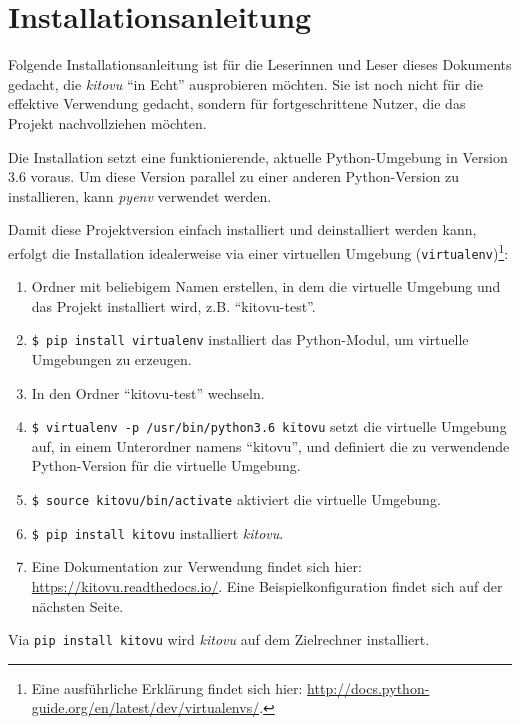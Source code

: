 \documentclass[a4paper]{article}
\let\oldsection\section
\renewcommand\section{\clearpage\oldsection}
\begin{document}
\section{Installationsanleitung}

Folgende Installationsanleitung ist für die Leserinnen und Leser dieses Dokuments gedacht, die \emph{kitovu} ``in Echt'' ausprobieren möchten. Sie ist noch nicht für die effektive Verwendung gedacht, sondern für fortgeschrittene Nutzer, die das Projekt nachvollziehen möchten.

Die Installation setzt eine funktionierende, aktuelle Python-Umgebung in Version 3.6 voraus. Um diese Version parallel zu einer anderen Python-Version zu installieren, kann \emph{pyenv} verwendet werden.

Damit diese Projektversion einfach installiert und deinstalliert werden kann, erfolgt die Installation idealerweise via einer virtuellen Umgebung (\verb|virtualenv|)\footnote{Eine ausführliche Erklärung findet sich hier: \url{http://docs.python-guide.org/en/latest/dev/virtualenvs/}.}:

\begin{enumerate}
	\item Ordner mit beliebigem Namen erstellen, in dem die virtuelle Umgebung und das Projekt installiert wird, z.B. ``kitovu-test''.
	\item \verb|$ pip install virtualenv| \newline
	installiert das Python-Modul, um virtuelle Umgebungen zu erzeugen.
	\item In den Ordner ``kitovu-test'' wechseln.
	\item \verb|$ virtualenv -p /usr/bin/python3.6 kitovu| \newline
	setzt die virtuelle Umgebung auf, in einem Unterordner namens ``kitovu'', und definiert die zu verwendende Python-Version für die virtuelle Umgebung.
	\item \verb|$ source kitovu/bin/activate| \newline
	aktiviert die virtuelle Umgebung.
	\item \verb|$ pip install kitovu| \newline 
	installiert \emph{kitovu}.
	\item Eine Dokumentation zur Verwendung findet sich hier: \url{https://kitovu.readthedocs.io/}. Eine Beispielkonfiguration findet sich auf der nächsten Seite.
\end{enumerate}

Via \verb|pip install kitovu| wird \emph{kitovu} auf dem Zielrechner installiert.
\end{document}
